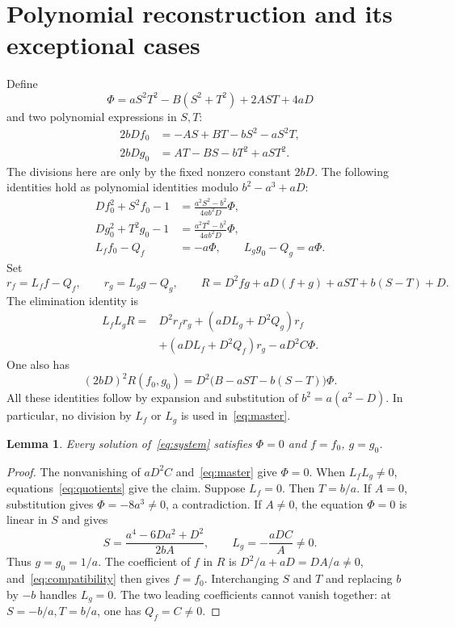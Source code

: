 \documentclass[11pt,a4paper]{article}
\newtheorem{lemma}[theorem]{Lemma}
\begin{document}
\section{Polynomial reconstruction and its exceptional cases}
Define
\[
 \Phi=aS^2T^2-B(S^2+T^2)+2AST+4aD
\]
and two polynomial expressions in $S,T$:
\begin{align}
 2bDf_0&=-AS+BT-bS^2-aS^2T,\label{eq:reconstruct}\\
 2bDg_0&=AT-BS-bT^2+aST^2.\nonumber
\end{align}
The divisions here are only by the fixed nonzero constant $2bD$.
The following identities hold as polynomial identities modulo
$b^2-a^3+aD$:
\begin{align}
 Df_0^2+S^2f_0-1
 &=\frac{a^2S^2-b^2}{4ab^2D}\Phi,\label{eq:curve}\\
 Dg_0^2+T^2g_0-1
 &=\frac{a^2T^2-b^2}{4ab^2D}\Phi,\nonumber\\
 L_ff_0-Q_f&=-a\Phi,\qquad L_gg_0-Q_g=a\Phi.\label{eq:quotients}
\end{align}
Set
\[
 r_f=L_ff-Q_f,\qquad r_g=L_gg-Q_g,
 \qquad R=D^2fg+aD(f+g)+aST+b(S-T)+D.
\]
The elimination identity is
\begin{equation}\label{eq:master}
\begin{split}
 L_fL_gR={}&D^2r_fr_g+(aDL_g+D^2Q_g)r_f\\
          &+(aDL_f+D^2Q_f)r_g-aD^2C\Phi.
\end{split}
\end{equation}
One also has
\begin{equation}\label{eq:compatibility}
 (2bD)^2R(f_0,g_0)=D^2\bigl(B-aST-b(S-T)\bigr)\Phi.
\end{equation}
All these identities follow by expansion and substitution of
$b^2=a(a^2-D)$. In particular, no division by $L_f$ or $L_g$ is
used in~\eqref{eq:master}.

\begin{lemma}\label{lem:unique}
Every solution of~\eqref{eq:system} satisfies $\Phi=0$ and
$f=f_0$, $g=g_0$.
\end{lemma}
\begin{proof}
The nonvanishing of $aD^2C$ and~\eqref{eq:master} give $\Phi=0$.
When $L_fL_g\ne0$, equations~\eqref{eq:quotients} give the claim.
Suppose $L_f=0$. Then $T=b/a$. If $A=0$, substitution gives
$\Phi=-8a^3\ne0$, a contradiction. If $A\ne0$, the equation
$\Phi=0$ is linear in $S$ and gives
\[
 S=\frac{a^4-6Da^2+D^2}{2bA},\qquad
 L_g=-\frac{aDC}{A}\ne0.
\]
Thus $g=g_0=1/a$. The coefficient of $f$ in $R$ is
$D^2/a+aD=DA/a\ne0$, and~\eqref{eq:compatibility} then gives
$f=f_0$. Interchanging $S$ and $T$ and replacing $b$ by $-b$
handles $L_g=0$. The two leading coefficients cannot vanish
together: at $S=-b/a,T=b/a$, one has $Q_f=C\ne0$.
\end{proof}
\end{document}
